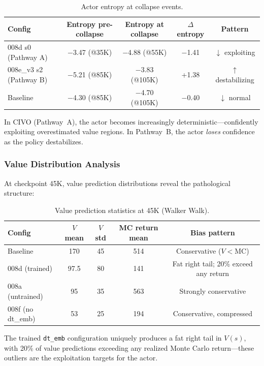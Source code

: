 \documentclass[letterpaper]{article}
\begin{document}
\begin{table}[h]
\centering
\caption{Actor entropy at collapse events.}
\label{tab:entropy}
\begin{tabular}{lcccc}
\toprule
Config & Entropy pre-collapse & Entropy at collapse & $\Delta$ entropy & Pattern \\
\midrule
008d s0 (Pathway A) & $-$3.47 (@35K) & $-$4.88 (@55K) & $-$1.41 & $\downarrow$ exploiting \\
008e\_v3 s2 (Pathway B) & $-$5.21 (@85K) & $-$3.83 (@105K) & +1.38 & $\uparrow$ destabilizing \\
Baseline & $-$4.30 (@85K) & $-$4.70 (@105K) & $-$0.40 & $\downarrow$ normal \\
\bottomrule
\end{tabular}
\end{table}

In CIVO (Pathway~A), the actor becomes increasingly deterministic---confidently exploiting overestimated value regions.
In Pathway~B, the actor \emph{loses} confidence as the policy destabilizes.

\subsubsection{Value Distribution Analysis}

At checkpoint 45K, value prediction distributions reveal the pathological structure:

\begin{table}[h]
\centering
\caption{Value prediction statistics at 45K (Walker Walk).}
\label{tab:value_dist}
\begin{tabular}{lcccc}
\toprule
Config & $V$ mean & $V$ std & MC return mean & Bias pattern \\
\midrule
Baseline & 170 & 45 & 514 & Conservative ($V < \text{MC}$) \\
008d (trained) & 97.5 & 80 & 141 & Fat right tail; 20\% exceed any return \\
008a (untrained) & 95 & 35 & 563 & Strongly conservative \\
008f (no dt\_emb) & 53 & 25 & 194 & Conservative, compressed \\
\bottomrule
\end{tabular}
\end{table}

The trained \texttt{dt\_emb} configuration uniquely produces a fat right tail in $V(s)$, with 20\% of value predictions exceeding any realized Monte Carlo return---these outliers are the exploitation targets for the actor.
\end{document}
